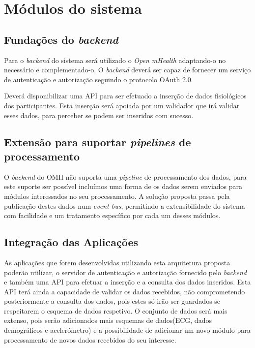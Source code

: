 \section{Módulos do sistema}
\subsection{Fundações do \textit{backend}}
Para o \textit{backend} do sistema será utilizado o \textit{Open mHealth} adaptando-o no necessário e complementado-o. O \textit{backend} deverá ser capaz de fornecer um serviço de autenticação e autorização seguindo o protocolo OAuth 2.0. \par 
Deverá disponibilizar uma \gls{API} para ser efetuado a inserção de dados fisiológicos dos participantes. Esta inserção será apoiada por um validador que irá validar esses dados, para perceber se podem ser inseridos com sucesso.


\subsection{Extensão para suportar \textit{pipelines} de processamento}
O \textit{backend} do \gls{OMH} não suporta uma \textit{pipeline} de processamento dos dados, para este suporte ser possível incluímos uma forma de os dados serem enviados para módulos interessados no seu processamento. A solução proposta passa pela publicação destes dados num \textit{event bus}, permitindo a extensibilidade do sistema com facilidade e um tratamento específico por cada um desses módulos.


\subsection{Integração das Aplicações}
As aplicações que forem desenvolvidas utilizando esta arquitetura proposta poderão utilizar, o servidor de autenticação e autorização fornecido pelo \textit{backend} e também uma \gls{API} para efetuar a inserção e a consulta dos dados inseridos. Esta \gls{API} terá ainda a capacidade de validar os dados recebidos, não comprometendo posteriormente a consulta dos dados, pois estes só irão ser guardados se respeitarem o esquema de dados respetivo. O conjunto de dados será mais extenso, pois serão adicionados mais esquemas de dados(\gls{ECG}, dados demográficos e acelerómetro) e a possibilidade de adicionar um novo módulo para processamento de novos dados recebidos do seu interesse.





